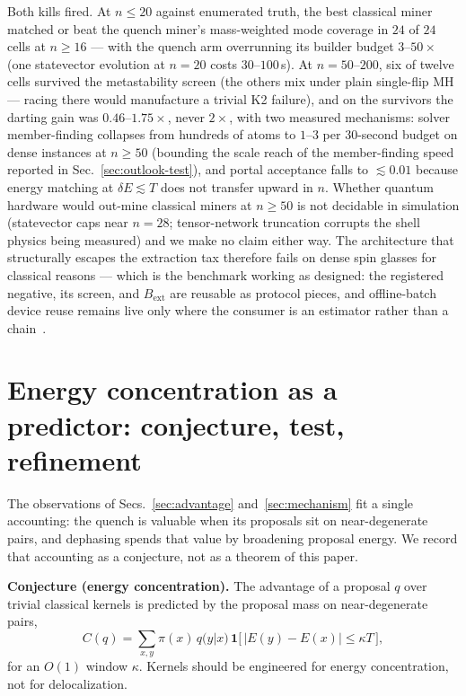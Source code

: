 \documentclass[aps,prx,reprint,floatfix,amsmath,amssymb,amsfonts]{revtex4-2}
\begin{document}
Both kills fired. At $n\le 20$ against enumerated truth, the best
classical miner matched or beat the quench miner's mass-weighted mode
coverage in $24$ of $24$ cells at $n\ge 16$ --- with the quench arm
overrunning its builder budget $3$--$50\times$ (one statevector
evolution at $n=20$ costs $30$--$100$\,s). At $n=50$--$200$, six of
twelve cells survived the metastability screen (the others mix under
plain single-flip MH --- racing there would manufacture a trivial K2
failure), and on the survivors the darting gain was $0.46$--$1.75\times$,
never $2\times$, with two measured mechanisms: solver member-finding
collapses from hundreds of atoms to $1$--$3$ per 30-second budget on
dense instances at $n\ge 50$ (bounding the scale reach of the
member-finding speed reported in Sec.~\ref{sec:outlook-test}), and
portal acceptance falls to $\lesssim 0.01$ because energy matching at
$\delta E \lesssim T$ does not transfer upward in $n$. Whether quantum
hardware would out-mine classical miners at $n\ge 50$ is not decidable
in simulation (statevector caps near $n=28$; tensor-network truncation
corrupts the shell physics being measured) and we make no claim either
way. The architecture that structurally escapes the extraction tax
therefore fails on dense spin glasses for classical reasons ---
which is the benchmark working as designed: the registered negative,
its screen, and $B_{\mathrm{ext}}$ are reusable as protocol pieces,
and offline-batch device reuse remains live only where the consumer
is an estimator rather than a chain~\cite{Camino2025}.

\section{Energy concentration as a predictor: conjecture, test, refinement}
\label{sec:outlook}

The observations of Secs.~\ref{sec:advantage} and~\ref{sec:mechanism}
fit a single accounting: the quench is valuable when its proposals sit
on near-degenerate pairs, and dephasing spends that value by broadening
proposal energy. We record that accounting as a conjecture, not as a
theorem of this paper.

\noindent\textbf{Conjecture (energy concentration).}
The advantage of a proposal $q$ over trivial classical kernels is
predicted by the proposal mass on near-degenerate pairs,
\begin{equation}
  C(q)
  =
  \sum_{x,y} \pi(x)\, q(y|x)\, \mathbf{1}\bigl[\,|E(y)-E(x)| \le \kappa T\,\bigr],
\end{equation}
for an $O(1)$ window $\kappa$. Kernels should be engineered for energy
concentration, not for delocalization.
\end{document}
